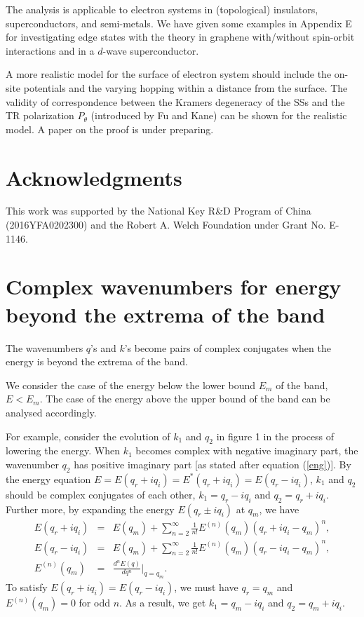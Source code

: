 \documentclass[aps,pra,amsmath,twocolumn,showpacs,bibnotes,10pt]{revtex4-1}
\begin{document}
The analysis is applicable to electron systems in (topological) insulators, superconductors, and semi-metals. We have given some examples in Appendix E for investigating edge states with the theory in graphene with/without spin-orbit interactions and in a $d$-wave superconductor.

A more realistic model for the surface of electron system should include the on-site potentials and the varying hopping within a distance from the surface. The validity of correspondence between the Kramers degeneracy of the SSs and the TR polarization $P_{\theta}$ (introduced by Fu and Kane) can be shown for the realistic model. A paper on the proof is under preparing.

\section*{Acknowledgments}

This work was supported by the National Key R\&D Program of China (2016YFA0202300) and the Robert A. Welch Foundation under Grant No. E-1146.

\appendix
\section{Complex wavenumbers for energy beyond the extrema of the band}
\renewcommand{\theequation}{\thesection\arabic{equation}}
\setcounter{equation}{0}

The wavenumbers $q$'s and $k$'s become pairs of complex conjugates when the energy is beyond the extrema of the band. 

We consider the case of the energy below the lower bound $E_m$ of the band, $E < E_m$. The case of the energy above the upper bound of the band can be analysed accordingly. 

For example, consider the evolution of $k_1$ and $q_2$ in figure 1 in the process of lowering the energy. When $k_1$ becomes complex with negative imaginary part, the wavenumber $q_2$ has positive imaginary part [as stated after equation (\ref{eng})]. By the energy equation $E = E(q_r+iq_i) = E^{\ast}(q_r+iq_i) = E(q_r-iq_i)$, $k_1$ and $q_2$ should be complex conjugates of each other, $k_1 = q_r-iq_i$ and $q_2 = q_r+iq_i$. Further more, by expanding the energy $E(q_r\pm iq_i)$ at $q_m$, we have 
\begin{eqnarray}
E(q_r+iq_i) &=& E(q_m)+\sum_{n=2}^{\infty}\frac{1}{n!}E^{(n)}(q_m)(q_r+iq_i-q_m)^n,   \nonumber\\
E(q_r-iq_i) &=& E(q_m)+\sum_{n=2}^{\infty}\frac{1}{n!}E^{(n)}(q_m)(q_r-iq_i-q_m)^n,   \nonumber\\
E^{(n)}(q_m)&=& \frac{d^nE(q)}{dq^n}|_{q=q_m}. \nonumber
\end{eqnarray}
To satisfy $E(q_r+iq_i) = E(q_r-iq_i)$, we must have $q_r = q_m$ and $E^{(n)}(q_m) =0$ for odd $n$. As a result, we get $k_1 = q_m-iq_i$ and $q_2 = q_m+iq_i$.
\end{document}

